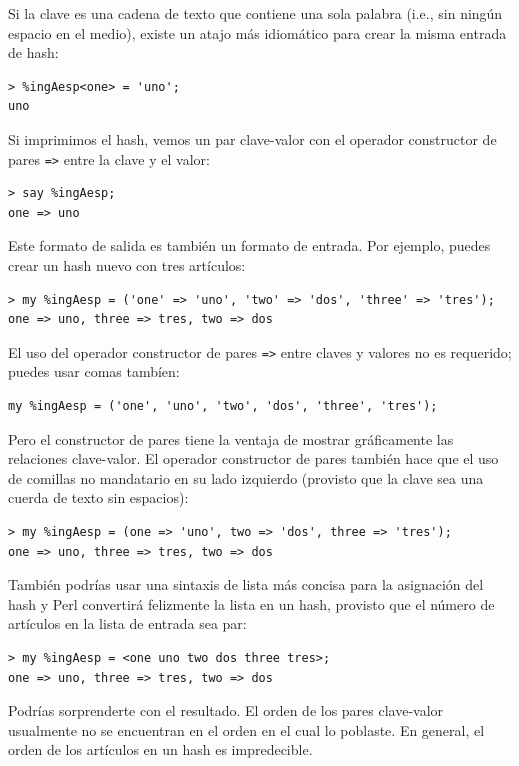 Si la clave es una cadena de texto que contiene una sola palabra
(i.e., sin ningún espacio en el medio), existe un atajo más 
idiomático para crear la misma entrada de hash:

\begin{lstlisting}
> %ingAesp<one> = 'uno';
uno
\end{lstlisting}
%
Si imprimimos el hash, vemos un par clave-valor con el 
operador constructor de pares \verb|=>| entre la clave y
el valor:

\begin{lstlisting}
> say %ingAesp;
one => uno
\end{lstlisting}
%
Este formato de salida es también un formato de entrada.
Por ejemplo, puedes crear un hash nuevo con tres artículos:

\begin{lstlisting}
> my %ingAesp = ('one' => 'uno', 'two' => 'dos', 'three' => 'tres');
one => uno, three => tres, two => dos
\end{lstlisting}
%

El uso del operador constructor de pares \verb|=>| entre claves y 
valores no es requerido; puedes usar comas tambíen:

\begin{lstlisting}
my %ingAesp = ('one', 'uno', 'two', 'dos', 'three', 'tres');
\end{lstlisting}
%

Pero el constructor de pares tiene la ventaja de mostrar
gráficamente las relaciones clave-valor. El operador constructor
de pares también hace que el uso de comillas no mandatario
en su lado izquierdo (provisto que la clave sea una cuerda 
de texto sin espacios):

\begin{lstlisting}
> my %ingAesp = (one => 'uno', two => 'dos', three => 'tres');
one => uno, three => tres, two => dos
\end{lstlisting}
%

También podrías usar una sintaxis de lista más concisa para la
asignación del hash y Perl convertirá felizmente la lista
en un hash, provisto que el número de artículos en la lista 
de entrada sea par:

\begin{lstlisting}
> my %ingAesp = <one uno two dos three tres>;
one => uno, three => tres, two => dos
\end{lstlisting}
%

Podrías sorprenderte con el resultado. El orden de los
pares clave-valor usualmente no se encuentran en el orden
en el cual lo poblaste. En general, el orden de los artículos
en un hash es impredecible.

